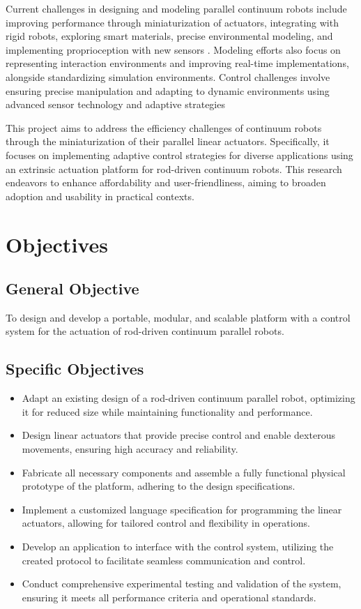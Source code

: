 \par Current challenges in designing and modeling parallel continuum robots include improving performance through miniaturization of actuators, integrating with rigid robots, exploring smart materials, precise environmental modeling, and implementing proprioception with new sensors \cite{russo2023}. Modeling efforts also focus on representing interaction environments and improving real-time implementations, alongside standardizing simulation environments. Control challenges involve ensuring precise manipulation and adapting to dynamic environments using advanced sensor technology and adaptive strategies

\par This project aims to address the efficiency challenges of continuum robots through the miniaturization of their parallel linear actuators. Specifically, it focuses on implementing adaptive control strategies for diverse applications using an extrinsic actuation platform for rod-driven continuum robots. This research endeavors to enhance affordability and user-friendliness, aiming to broaden adoption and usability in practical contexts.


\section{Objectives}

\subsection{General Objective}
To design and develop a portable, modular, and scalable platform with a control system for the actuation of rod-driven continuum parallel robots.

\subsection{Specific Objectives}
\begin{itemize}
    \item Adapt an existing design of a rod-driven continuum parallel robot, optimizing it for reduced size while maintaining functionality and performance.
    \item Design linear actuators that provide precise control and enable dexterous movements, ensuring high accuracy and reliability.
    \item Fabricate all necessary components and assemble a fully functional physical prototype of the platform, adhering to the design specifications.
    \item Implement a customized language specification for programming the linear actuators, allowing for tailored control and flexibility in operations.
    \item Develop an application to interface with the control system, utilizing the created protocol to facilitate seamless communication and control.
    \item Conduct comprehensive experimental testing and validation of the system, ensuring it meets all performance criteria and operational standards.
\end{itemize}